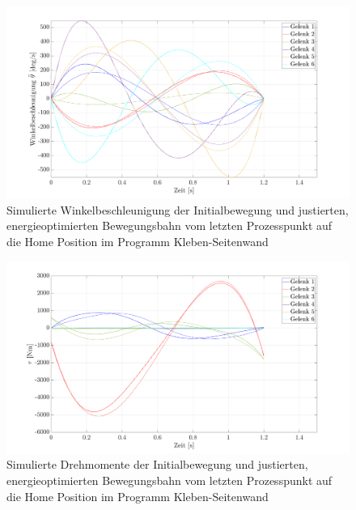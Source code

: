%
\begin{figure}[tbph]
	\centering
	\includegraphics[width=1\linewidth]{images/Optimierungsergebnisse_up/accoptfinal}
	\caption{Simulierte Winkelbeschleunigung  der Initialbewegung  und justierten, energieoptimierten Bewegungsbahn vom letzten Prozesspunkt auf die  Home Position im Programm Kleben-Seitenwand}
	\label{fig:accoptfinal}
\end{figure}
%
%
\begin{figure}[tbph]
	\centering
	\includegraphics[width=1\linewidth]{images/Optimierungsergebnisse_up/tauoptfinal}
	\caption{Simulierte Drehmomente  der Initialbewegung  und justierten, energieoptimierten Bewegungsbahn vom letzten Prozesspunkt auf die  Home Position im Programm Kleben-Seitenwand}
	\label{fig:tauoptfinal}
\end{figure}
